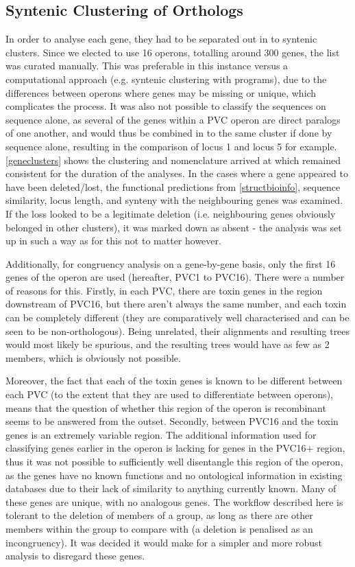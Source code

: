 \subsection{Syntenic Clustering of Orthologs}\label{clustering}
In order to analyse each gene, they had to be separated out in to syntenic clusters. Since we elected to use 16 operons, totalling around 300 genes, the list was curated manually. This was preferable in this instance versus a computational approach (e.g. syntenic clustering with programs), due to the differences between operons where genes may be missing or unique, which complicates the process. It was also not possible to classify the sequences on sequence alone, as several of the genes within a PVC operon are direct paralogs of one another, and would thus be combined in to the same cluster if done by sequence alone, resulting in the comparison of locus 1 and locus 5 for example. \vref{geneclusters} shows the clustering and nomenclature arrived at which remained consistent for the duration of the analyses. In the cases where a gene appeared to have been deleted/lost, the functional predictions from \vref{structbioinfo}, sequence similarity, locus length, and synteny with the neighbouring genes was examined. If the loss looked to be a legitimate deletion (i.e. neighbouring genes obviously belonged in other clusters), it was marked down as absent - the analysis was set up in such a way as for this not to matter however.

Additionally, for congruency analysis on a gene-by-gene basis, only the first 16 genes of the operon are used (hereafter, PVC1 to PVC16). There were a number of reasons for this. Firstly, in each PVC, there are toxin genes in the region downstream of PVC16, but there aren't always the same number, and each toxin can be completely different (they are comparatively well characterised and can be seen to be non-orthologous). Being unrelated, their alignments and resulting trees would most likely be spurious, and the resulting trees would have as few as 2 members, which is obviously not possible.

Moreover, the fact that each of the toxin genes is known to be different between each PVC (to the extent that they are used to differentiate between operons), means that the question of whether this region of the operon is recombinant seems to be answered from the outset. Secondly, between PVC16 and the toxin genes is an extremely variable region. The additional information used for classifying genes earlier in the operon is lacking for genes in the PVC16+ region, thus it was not possible to sufficiently well disentangle this region of the operon, as the genes have no known functions and no ontological information in existing databases due to their lack of similarity to anything currently known.
Many of these genes are unique, with no analogous genes. The workflow described here is tolerant to the deletion of members of a group, as long as there are other members within the group to compare with (a deletion is penalised as an incongruency). It was decided it would make for a simpler and more robust analysis to disregard these genes. 

